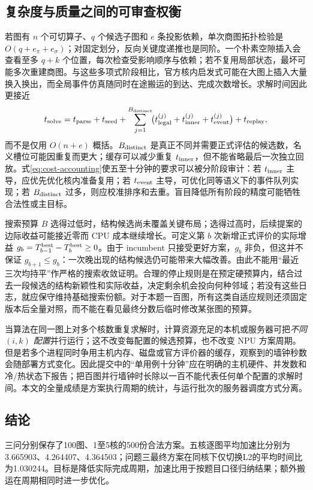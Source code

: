 \subsection{复杂度与质量之间的可审查权衡}
若图有 $n$ 个可切算子、$q$ 个候选子图和 $e$ 条投影依赖，单次商图拓扑检验是 $O(q+e_\pi+e_\sigma)$；对固定划分，反向关键度递推也是同阶。一个朴素空隙插入会查看至多 $q+k$ 个位置，每次检查受影响顺序与依赖；若不复用局部状态，最坏可能多次重建商图。与这些多项式阶段相比，官方核内启发式可能在大图上插入大量换入换出，而全局事件仿真随同时在途搬运的到达、完成次数增长。求解时间因此更接近
\begin{equation}\label{eq:cost-accounting}
t_{\rm solve}
=t_{\rm parse}+t_{\rm seed}
+\sum_{j=1}^{B_{\rm distinct}}\!
\bigl(t_{\rm legal}^{(j)}+t_{\rm inner}^{(j)}+t_{\rm event}^{(j)}\bigr)
+t_{\rm replay},
\end{equation}
而不是仅用 $O(n+e)$ 概括。$B_{\rm distinct}$ 是真正不同并需要正式评估的候选数，名义槽位可能因重复而更大；缓存可以减少重复 $t_{\rm inner}$，但不能省略最后一次独立回放。式\eqref{eq:cost-accounting}使五至十分钟的要求可以被分阶段审计：若 $t_{\rm inner}$ 主导，应优先优化核内准备复用；若 $t_{\rm event}$ 主导，可优化同等语义下的事件队列实现；若 $B_{\rm distinct}$ 过多，则应校准排序和去重。盲目降低所有阶段的精度可能牺牲合法性或主目标。

搜索预算 $B$ 选得过低时，结构候选尚未覆盖关键布局；选得过高时，后续提案的边际收益可能接近零而 CPU 成本继续增长。可定义第 $b$ 次新增正式评价的实际增益 $g_b=T_{b-1}^{\rm best}-T_b^{\rm best}\ge0$。由于 incumbent 只接受更好方案，$g_b$ 非负，但这并不保证 $g_{b+1}\le g_b$：一次晚出现的结构候选仍可能带来大幅改善。由此不能用“最近三次均持平”作严格的搜索收敛证明。合理的停止规则是在预定硬预算内，结合过去一段候选的结构新颖性和实际收益，决定剩余机会投向何种邻域；若没有这些日志，就应保守维持基础搜索份额。对于本题一百图，所有这类自适应规则还须固定版本后全量对照，而不能在看见最终分数后临时修改某张图的预算。

当算法在同一图上对多个核数重复求解时，计算资源充足的本机或服务器可把\emph{不同 $(i,k)$ 配置}并行运行；这不改变每配置的候选预算，也不改变 NPU 方案周期。但是若多个进程同时争用主机内存、磁盘或官方评价器的缓存，观察到的墙钟秒数会随部署方式变化。因此提交中的“单用例十分钟”应在明确的主机硬件、并发数和冷/热状态下报告；把百图并行墙钟时长除以一百不能代表任何单个配置的求解时间。本文的全量成绩是方案执行周期的统计，与运行批次的服务器调度方式分离。

\subsection{结论}
三问分别保存了100图、1至5核的500份合法方案。五核逐图平均加速比分别为3.665903、4.264407、4.364503；问题三最终方案在同核下仅切换L2的平均时间比为1.030244。目标是降低实际完成周期，加速比用于按题目口径归纳结果；额外搬运在周期相同时进一步优化。
